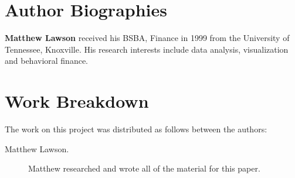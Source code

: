 \documentclass[9pt,twocolumn,twoside]{styles/osajnl}
\begin{document}
\section*{Author Biographies}
\begingroup
\setlength\intextsep{0pt}
\begin{minipage}[t][3.2cm][t]{1.0\columnwidth} %
  \noindent
  {\bfseries Matthew Lawson} received his BSBA, Finance in 1999 from
  the University of Tennessee, Knoxville. His research interests include
  data analysis, visualization and behavioral finance.
\end{minipage}
\endgroup

\appendix

\section{Work Breakdown}

The work on this project was distributed as follows between the
authors:

\begin{description}

\item[Matthew Lawson.] Matthew researched and wrote all of the material for this paper.

\end{description}
\end{document}
